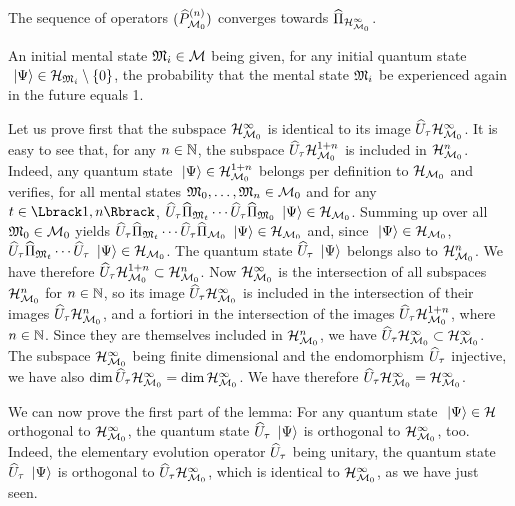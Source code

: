  The sequence of operators $(\widehat{P}_{\mathcal M_0}^{(n)})$ converges towards $\widehat{\Pi}_{\mathcal H_{\mathcal M_0}^\infty}$.

 An initial mental state $\mathfrak{M}_i \in \mathcal M$ being given, for any initial quantum state $\ \left|{\Psi}\right\rangle \in \mathcal H_{\mathfrak{M}_i} \setminus \{0\}$, the probability that the mental state $\mathfrak{M}_i$ be experienced again in the future equals 1.

 Let us prove first that the subspace $\mathcal H_{\mathcal M_0}^\infty$ is identical to its image $\widehat{U}_\tau \mathcal H_{\mathcal M_0}^\infty$. It is easy to see that, for any $n \in \mathbb{N}$, the subspace $\widehat{U}_\tau \mathcal H_{\mathcal M_0}^{1+n}$ is included in $\mathcal H_{\mathcal M_0}^n$. Indeed, any quantum state $\ \left|{\Psi}\right\rangle \in \mathcal H_{\mathcal M_0}^{1+n}$ belongs per definition to $\mathcal H_{\mathcal M_0}$ and verifies, for all mental states $\mathfrak{M}_0, \dotsc, \mathfrak{M}_n \in \mathcal M_0$ and for any $t \in \IntRange{1}{n}$, $\widehat{U}_\tau \widehat{\Pi}_{\mathfrak{M}_t} \dotsm \widehat{U}_\tau \widehat{\Pi}_{\mathfrak{M}_0} \ \left|{\Psi}\right\rangle \in \mathcal H_{\mathcal M_0}$. Summing up over all $\mathfrak{M}_0 \in \mathcal M_0$ yields $\widehat{U}_\tau \widehat{\Pi}_{\mathfrak{M}_t} \dotsm \widehat{U}_\tau \widehat{\Pi}_{\mathcal M_0} \ \left|{\Psi}\right\rangle \in \mathcal H_{\mathcal M_0}$ and, since $\ \left|{\Psi}\right\rangle \in \mathcal H_{\mathcal M_0}$, $\widehat{U}_\tau \widehat{\Pi}_{\mathfrak{M}_t} \dotsm \widehat{U}_\tau \ \left|{\Psi}\right\rangle \in \mathcal H_{\mathcal M_0}$. The quantum state $\widehat{U}_\tau \ \left|{\Psi}\right\rangle$ belongs also to $\mathcal H_{\mathcal M_0}^n$. We have therefore $\widehat{U}_\tau \mathcal H_{\mathcal M_0}^{1+n} \subset \mathcal H_{\mathcal M_0}^n$. Now $\mathcal H_{\mathcal M_0}^\infty$ is the intersection of all subspaces $\mathcal H_{\mathcal M_0}^n$ for $n \in \mathbb{N}$, so its image $\widehat{U}_\tau \mathcal H_{\mathcal M_0}^\infty$ is included in the intersection of their images $\widehat{U}_\tau \mathcal H_{\mathcal M_0}^n$, and a fortiori in the intersection of the images $\widehat{U}_\tau \mathcal H_{\mathcal M_0}^{1+n}$, where $n \in \mathbb{N}$. Since they are themselves included in $\mathcal H_{\mathcal M_0}^n$, we have $\widehat{U}_\tau \mathcal H_{\mathcal M_0}^\infty \subset \mathcal H_{\mathcal M_0}^\infty$. The subspace $\mathcal H_{\mathcal M_0}^\infty$ being finite dimensional and the endomorphism $\widehat{U}_\tau$ injective, we have also $\dim \widehat{U}_\tau \mathcal H_{\mathcal M_0}^\infty = \dim \mathcal H_{\mathcal M_0}^\infty$. We have therefore $\widehat{U}_\tau \mathcal H_{\mathcal M_0}^\infty = \mathcal H_{\mathcal M_0}^\infty$.

 We can now prove the first part of the lemma: For any quantum state $\ \left|{\Psi}\right\rangle \in \mathcal H$ orthogonal to $\mathcal H_{\mathcal M_0}^\infty$, the quantum state $\widehat{U}_\tau \ \left|{\Psi}\right\rangle$ is orthogonal to $\mathcal H_{\mathcal M_0}^\infty$, too. Indeed, the elementary evolution operator $\widehat{U}_\tau$ being unitary, the quantum state $\widehat{U}_\tau \ \left|{\Psi}\right\rangle$ is orthogonal to $\widehat{U}_\tau \mathcal H_{\mathcal M_0}^\infty$, which is identical to $\mathcal H_{\mathcal M_0}^\infty$, as we have just seen.

